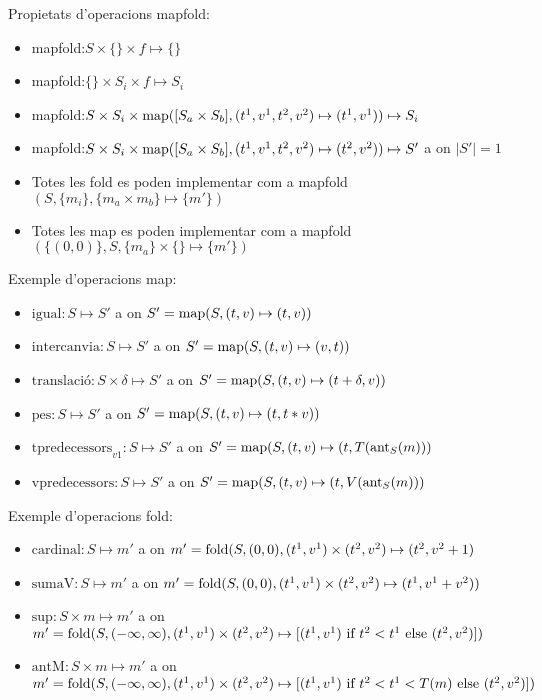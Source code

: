 Propietats d'operacions mapfold:
\begin{itemize}
\item mapfold:$S \times \{\} \times f \mapsto \{\}$ 

\item mapfold:$\{\} \times S_i \times f \mapsto S_i$ 

\item mapfold:$S \times S_i \times
  \operatorname*{map}([S_a\times S_b],(t^1,v^1,t^2,v^2)\mapsto(t^1,v^1)) \mapsto S_i$

\item mapfold:$S \times S_i \times \operatorname*{map}([S_a\times
  S_b],(t^1,v^1,t^2,v^2)\mapsto(t^2,v^2)) \mapsto S'$ a on $|S'|=1$

\item Totes les fold es poden implementar com a mapfold$(S,\{m_i\},
  \{m_a \times m_b\} \mapsto \{m'\})$

\item Totes les map es poden implementar com a mapfold$(\{(0,0)\},S,
  \{m_a\} \times  \{\} \mapsto \{m'\})$
\end{itemize}



Exemple d'operacions map:
\begin{itemize}
\item $\text{igual}: S \mapsto S'$ a on $S'= \operatorname*{map}(S,(t,v)\mapsto(t,v))$
\item $\text{intercanvia}: S \mapsto S'$ a on $S'= \operatorname*{map}(S,(t,v)\mapsto(v,t))$
\item $\text{translació}: S \times \delta \mapsto S'$ a on $S'=
  \operatorname*{map}(S,(t,v)\mapsto(t+\delta,v))$
\item $\text{pes}: S \mapsto S'$ a on $S'= \operatorname*{map}(S,(t,v)\mapsto(t,t*v))$
\item $\text{tpredecessors}_{v1}: S \mapsto S'$ a on $S'= \operatorname*{map}(S,(t,v)
  \mapsto (t,T(\operatorname*{ant}_S(m)))$ 
\item $\text{vpredecessors}: S \mapsto S'$ a on $S'= \operatorname*{map}(S,(t,v)
  \mapsto (t,V(\operatorname*{ant}_S(m)))$
\end{itemize}

Exemple d'operacions fold:
\begin{itemize}
\item $\text{cardinal}: S \mapsto m'$ a on $m'=
  \operatorname*{fold}(S,(0,0),(t^1,v^1)\times(t^2,v^2)\mapsto(t^2,v^2+1)$
\item $\text{sumaV}: S \mapsto m'$ a on $m'=
  \operatorname*{fold}(S,(0,0),(t^1,v^1)\times(t^2,v^2)\mapsto(t^1,v^1+v^2))$
\item $\text{sup}: S \times m \mapsto m'$ a on $m'=
  \operatorname*{fold}(S,(-\infty,\infty),(t^1,v^1)\times(t^2,v^2)\mapsto [(t^1,v^1)
  \text{ if } t^2 < t^1 \text{ else } (t^2,v^2) ])$
\item $\text{antM}: S \times m \mapsto m'$ a on $m'=
  \operatorname*{fold}(S,(-\infty,\infty),(t^1,v^1)\times(t^2,v^2)\mapsto [(t^1,v^1)
  \text{ if } t^2 < t^1 < T(m) \text{ else } (t^2,v^2) ])$
\end{itemize}


